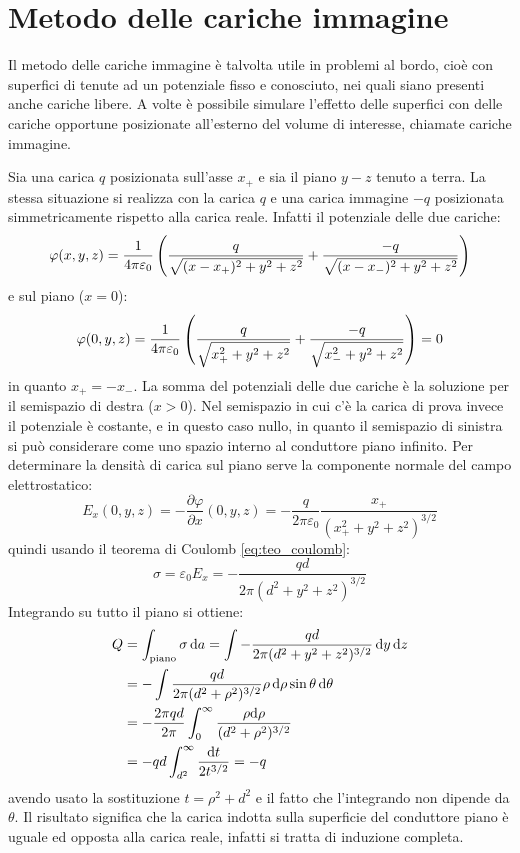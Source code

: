 \section{Metodo delle cariche immagine}
Il metodo delle cariche immagine è talvolta utile in problemi al bordo, cioè con superfici di tenute ad un potenziale fisso e conosciuto, nei quali siano presenti anche cariche libere. A volte è possibile simulare l'effetto delle superfici con delle cariche opportune posizionate all'esterno del volume di interesse, chiamate cariche immagine.
\begin{Es}
  \label{es:carica_e_piano_infinito}
  Sia una carica $q$ posizionata sull'asse $x_+$ e sia il piano $y-z$ tenuto a terra. La stessa situazione si realizza con la carica $q$ e una carica immagine $-q$ posizionata simmetricamente rispetto alla carica reale. Infatti il potenziale delle due cariche:
  \[
    \varphi(x,y,z)=\frac{1}{4\pi\varepsilon_0}\left(\frac{q}{\sqrt{(x-x_+)^2+y^2+z^2}}+\frac{-q}{\sqrt{(x-x_-)^2+y^2+z^2}}\right)
  \]
  e sul piano ($x=0$):
  \[
    \varphi(0,y,z)=\frac{1}{4\pi\varepsilon_0}\left(\frac{q}{\sqrt{x_+^2+y^2+z^2}}+\frac{-q}{\sqrt{x_-^2+y^2+z^2}}\right)=0
  \]
  in quanto $x_+ = -x_-$. La somma del potenziali delle due cariche è la soluzione per il semispazio di destra ($x>0$). Nel semispazio in cui c'è la carica di prova invece il potenziale è costante, e in questo caso nullo, in quanto il semispazio di sinistra si può considerare come uno spazio interno al conduttore piano infinito. Per determinare la densità di carica sul piano serve la componente normale del campo elettrostatico:
  \[
    E_x(0,y,z) = -\frac{\partial\varphi}{\partial x}(0,y,z) = -\frac{q}{2\pi\varepsilon_0}\frac{x_+}{(x_+^2+y^2+z^2)^{3/2}}
  \]
  quindi usando il teorema di Coulomb \eqref{eq:teo_coulomb}:
  \[
    \sigma = \varepsilon_0 E_x = -\frac{qd}{2\pi(d^2+y^2+z^2)^{3/2}}
  \]
  Integrando su tutto il piano si ottiene:
  \begin{equation*}
    \begin{aligned}
      Q & = \int_\text{piano} \sigma\,\mathrm{d} a = \int -\frac{qd}{2\pi(d^2+y^2+z^2)^{3/2}}\,\mathrm{d} y\,\mathrm{d} z \\
        & = -\int \frac{qd}{2\pi(d^2+\rho^2)^{3/2}} \rho\,\mathrm{d}\rho\sin\theta\,\mathrm{d}\theta               \\
        & = -\frac{2\pi qd}{2\pi}\int_0^\infty \frac{\rho\mathrm{d}\rho}{(d^2+\rho^2)^{3/2}}                \\
        & = -qd\int_{d^2}^\infty \frac{\mathrm{d} t}{2t^{3/2}} = -q
    \end{aligned}
  \end{equation*}
  avendo usato la sostituzione $t=\rho^2+d^2$ e il fatto che l'integrando non dipende da $\theta$. Il risultato significa che la carica indotta sulla superficie del conduttore piano è uguale ed opposta alla carica reale, infatti si tratta di induzione completa.
\end{Es}
